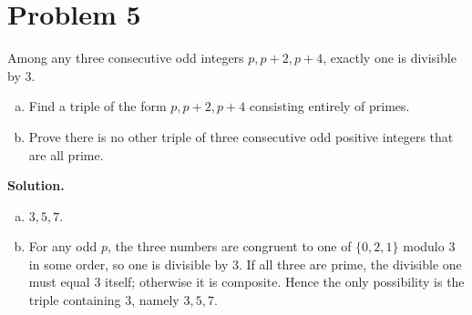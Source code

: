 \section*{Problem 5}

Among any three consecutive odd integers $p,p+2,p+4$, exactly one is divisible by $3$.

\begin{enumerate}[(a)]
\item Find a triple of the form $p,p+2,p+4$ consisting entirely of primes.
\item Prove there is no other triple of three consecutive odd positive integers that are all prime.
\end{enumerate}

\textbf{Solution.}

\begin{enumerate}[(a)]
\item $\boxed{3,5,7}$.
\item For any odd $p$, the three numbers are congruent to one of $\{0,2,1\}$ modulo $3$ in some order, so one is
divisible by $3$. If all three are prime, the divisible one must equal $3$ itself; otherwise it is composite.
Hence the only possibility is the triple containing $3$, namely $3,5,7$.
\end{enumerate}

